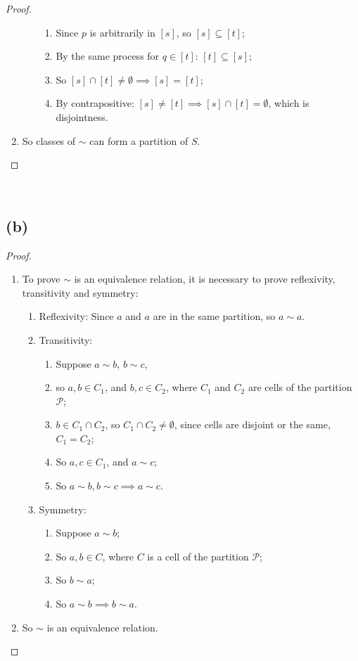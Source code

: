 \documentclass{article}
\begin{document}
\begin{proof}
\begin{enumerate}
\begin{enumerate}
\begin{enumerate}
            \item Since $p$ is arbitrarily in $[s]$, so $[s]\subseteq [t]$;
            \item By the same process for $q\in[t]$: $[t]\subseteq [s]$;
            \item So $[s]\cap[t]\ne \emptyset\implies[s]=[t]$;
            \item By contrapositive: $[s]\ne[t]\implies[s]\cap[t]= \emptyset$, which is disjointness.
        \end{enumerate}
    \end{enumerate}
    \item So classes of $\sim$ can form a partition of $S$.
\end{enumerate}
\end{proof}

~

\subsection*{(b)}

\begin{proof}
~
    \begin{enumerate}
        \item To prove $\sim $ is an equivalence relation, it is necessary to prove reflexivity, transitivity and symmetry:
        \begin{enumerate}
            \item Reflexivity: Since $a$ and $a$ are in the same partition, so $a\sim a$.
            \item Transitivity: \begin{enumerate}
                \item Suppose $a\sim b$, $b\sim c$,
                \item so $a,b\in C_1$, and $b,c\in C_2$, where $C_1$ and $C_2$ are cells of the partition $\mathcal{P}$;
                \item $b\in C_1\cap C_2$, so $C_1\cap C_2\ne\emptyset$, since cells are disjoint or the same, $C_1=C_2$;
                \item So $a,c\in C_1$, and $a\sim c$;
                \item So $a\sim b,b\sim c\implies a\sim c$.
            \end{enumerate}
            \item Symmetry: \begin{enumerate}
                \item Suppose $a\sim b$;
                \item So $a,b\in C$, where $C$ is a cell of the partition $\mathcal{P}$;
                \item So $b\sim a$;
                \item So $a\sim b\implies b\sim a$.
            \end{enumerate}
        \end{enumerate}
        \item So $\sim$ is an equivalence relation.
    \end{enumerate}
\end{proof}
\end{document}
